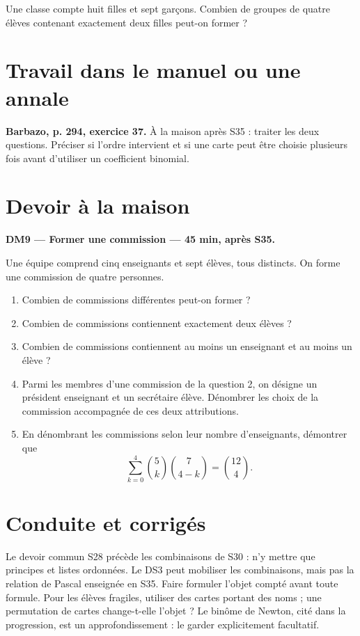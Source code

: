Une classe compte huit filles et sept garçons. Combien de groupes de quatre élèves contenant exactement deux filles peut-on former ?

\section{Travail dans le manuel ou une annale}\textbf{Barbazo, p. 294, exercice 37.} À la maison après S35 : traiter les deux questions. Préciser si l'ordre intervient et si une carte peut être choisie plusieurs fois avant d'utiliser un coefficient binomial.

\mxnewpage
\section{Devoir à la maison}\textbf{DM9 --- Former une commission --- 45 min, après S35.}\par Une équipe comprend cinq enseignants et sept élèves, tous distincts. On forme une commission de quatre personnes.
\begin{enumerate}\item Combien de commissions différentes peut-on former ?
\item Combien de commissions contiennent exactement deux élèves ?
\item Combien de commissions contiennent au moins un enseignant et au moins un élève ?
\item Parmi les membres d'une commission de la question 2, on désigne un président enseignant et un secrétaire élève. Dénombrer les choix de la commission accompagnée de ces deux attributions.
\item En dénombrant les commissions selon leur nombre d'enseignants, démontrer que \[\sum_{k=0}^4\binom5k\binom7{4-k}=\binom{12}4.\]\end{enumerate}

\ifmxteacher\mxnewpage\section{Conduite et corrigés}\begin{teachernote}Le devoir commun S28 précède les combinaisons de S30 : n'y mettre que principes et listes ordonnées. Le DS3 peut mobiliser les combinaisons, mais pas la relation de Pascal enseignée en S35. Faire formuler l'objet compté avant toute formule. Pour les élèves fragiles, utiliser des cartes portant des noms ; une permutation de cartes change-t-elle l'objet ? Le binôme de Newton, cité dans la progression, est un approfondissement : le garder explicitement facultatif.\end{teachernote}

